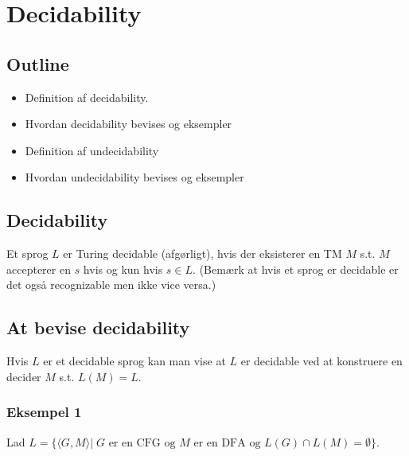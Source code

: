 \section{Decidability}

\subsection*{Outline}

\begin{itemize}
	\item Definition af decidability.
	\item Hvordan decidability bevises og eksempler 
	\item Definition af undecidability
	\item Hvordan undecidability bevises og eksempler  
\end{itemize}

\subsection*{Decidability}

Et sprog $L$ er Turing decidable (afgørligt), hvis der eksisterer en TM $M$ s.t. $M$ accepterer en $s$ hvis og kun hvis $s \in L$. (Bemærk at hvis et sprog er decidable er det også recognizable men ikke vice versa.)\\

\subsection*{At bevise decidability}

Hvis $L$ er et decidable sprog kan man vise at $L$ er decidable ved at konstruere en decider $M$ s.t. $L(M)=L$. \\ 

\subsubsection*{Eksempel 1}

Lad $L=\{\langle G,M \rangle| \; G \text{ er en CFG og } M \text{ er en DFA og } L(G) \cap L(M)=\emptyset \}$. \\

